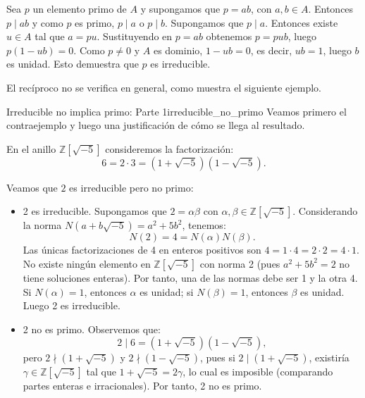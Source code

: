 \begin{proofbox}
Sea \(p\) un elemento primo de \(A\) y supongamos que \(p = ab\), con \(a, b \in A\). Entonces \(p \mid ab\) y como \(p\) es primo, \(p \mid a\) o \(p \mid b\). Supongamos que \(p \mid a\). Entonces existe \(u \in A\) tal que \(a = pu\). Sustituyendo en \(p = ab\) obtenemos \(p = pub\), luego \(p(1 - ub) = 0\). Como \(p \neq 0\) y \(A\) es dominio, \(1 - ub = 0\), es decir, \(ub = 1\), luego \(b\) es unidad. Esto demuestra que \(p\) es irreducible.
\end{proofbox}

El recíproco no se verifica en general, como muestra el siguiente ejemplo.

\begin{example}{Irreducible no implica primo: Parte 1}{irreducible_no_primo}
Veamos primero el contraejemplo y luego una justificación de cómo se llega al resultado.

En el anillo \(\mathbb{Z}[\sqrt{-5}]\) consideremos la factorización:
\[
6 = 2 \cdot 3 = (1 + \sqrt{-5})(1 - \sqrt{-5}).
\]

Veamos que \(2\) es irreducible pero no primo:
\begin{itemize}
\item 2 es irreducible. Supongamos que \(2 = \alpha\beta\) con \(\alpha, \beta \in \mathbb{Z}[\sqrt{-5}]\). Considerando la norma \(N(a + b\sqrt{-5}) = a^2 + 5b^2\), tenemos:
\[
N(2) = 4 = N(\alpha)N(\beta).
\]
Las únicas factorizaciones de 4 en enteros positivos son \(4 = 1 \cdot 4 = 2 \cdot 2 = 4 \cdot 1\). No existe ningún elemento en \(\mathbb{Z}[\sqrt{-5}]\) con norma 2 (pues \(a^2 + 5b^2 = 2\) no tiene soluciones enteras). Por tanto, una de las normas debe ser 1 y la otra 4. Si \(N(\alpha) = 1\), entonces \(\alpha\) es unidad; si \(N(\beta) = 1\), entonces \(\beta\) es unidad. Luego 2 es irreducible.

\item 2 no es primo. Observemos que:
\[
2 \mid 6 = (1 + \sqrt{-5})(1 - \sqrt{-5}),
\]
pero \(2 \nmid (1 + \sqrt{-5})\) y \(2 \nmid (1 - \sqrt{-5})\), pues si \(2 \mid (1 + \sqrt{-5})\), existiría \(\gamma \in \mathbb{Z}[\sqrt{-5}]\) tal que \(1 + \sqrt{-5} = 2\gamma\), lo cual es imposible (comparando partes enteras e irracionales). Por tanto, 2 no es primo.
\end{itemize}

\end{example}


